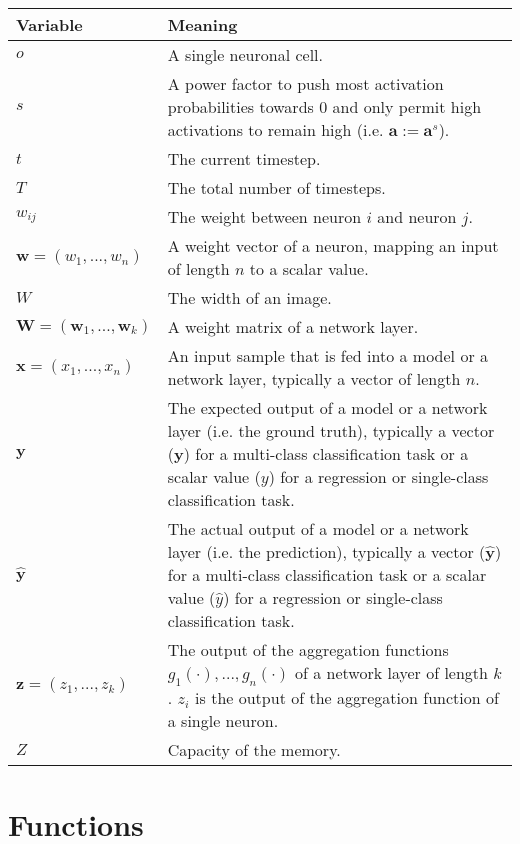  \begin{tabular}{ p{3cm} p{11cm} }
	\textbf{Variable} & \textbf{Meaning}\\
	\hline
    $o$ & A single neuronal cell.\\
    $s$ & A power factor to push most activation probabilities towards $0$ and only permit high activations to remain high (i.e. $\boldsymbol{a} := \boldsymbol{a}^s$).\\
    $t$ & The current timestep.\\
     $T$ & The total number of timesteps.\\
    $w_{ij}$ & The weight between neuron $i$ and neuron $j$.\\
	$\boldsymbol{w} = (w_1, ..., w_n)$ & A weight vector of a neuron, mapping an input of length $n$ to a scalar value.\\
    $W$ & The width of an image.\\
	$\boldsymbol{W} = (\boldsymbol{w}_1, ..., \boldsymbol{w}_k)$ & A weight matrix of a network layer.\\
    $\boldsymbol{x} = (x_1, ..., x_n)$ & An input sample that is fed into a model or a network layer, typically a vector of length $n$.\\
     $\boldsymbol{y}$ & The expected output of a model or a network layer (i.e. the ground truth), typically a vector ($\boldsymbol{y}$) for a multi-class classification task or a scalar value ($y$) for a regression or single-class classification task.\\
 	$\boldsymbol{\hat{y}}$ & The actual output of a model or a network layer (i.e. the prediction), typically a vector ($\boldsymbol{\hat{y}}$) for a multi-class classification task or a scalar value ($\hat{y}$) for a regression or single-class classification task.\\
	$\boldsymbol{z} = (z_1, ..., z_k)$ & The output of the aggregation functions $g_1(\cdot), ..., g_n(\cdot)$ of a network layer of length $k$. $z_i$  is the output of the aggregation function of a single neuron.\\
    $Z$ & Capacity of the memory.\\
\end{tabular}


\section{Functions}

